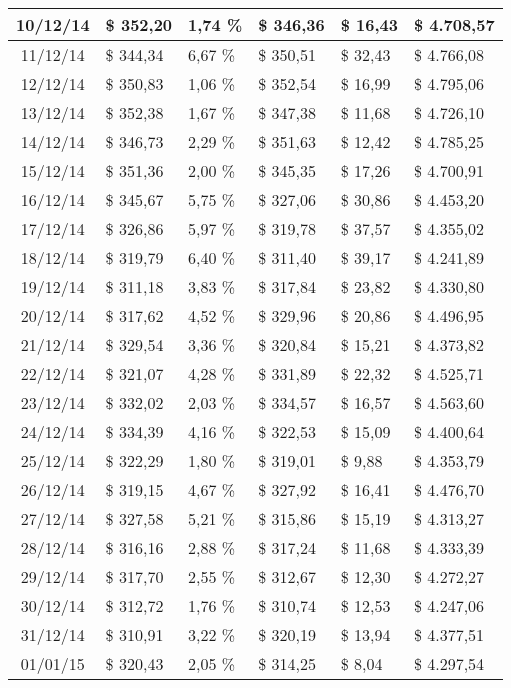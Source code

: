 \begin{small}
\begin{longtable}{|c|l|l|l|l|l|}
10/12/14 & \$ 352,20 & 1,74 \% & \$ 346,36 & \$ 16,43 & \$ 4.708,57 \\ \hline
11/12/14 & \$ 344,34 & 6,67 \% & \$ 350,51 & \$ 32,43 & \$ 4.766,08 \\ \hline
12/12/14 & \$ 350,83 & 1,06 \% & \$ 352,54 & \$ 16,99 & \$ 4.795,06 \\ \hline
13/12/14 & \$ 352,38 & 1,67 \% & \$ 347,38 & \$ 11,68 & \$ 4.726,10 \\ \hline
14/12/14 & \$ 346,73 & 2,29 \% & \$ 351,63 & \$ 12,42 & \$ 4.785,25 \\ \hline
15/12/14 & \$ 351,36 & 2,00 \% & \$ 345,35 & \$ 17,26 & \$ 4.700,91 \\ \hline
16/12/14 & \$ 345,67 & 5,75 \% & \$ 327,06 & \$ 30,86 & \$ 4.453,20 \\ \hline
17/12/14 & \$ 326,86 & 5,97 \% & \$ 319,78 & \$ 37,57 & \$ 4.355,02 \\ \hline
18/12/14 & \$ 319,79 & 6,40 \% & \$ 311,40 & \$ 39,17 & \$ 4.241,89 \\ \hline
19/12/14 & \$ 311,18 & 3,83 \% & \$ 317,84 & \$ 23,82 & \$ 4.330,80 \\ \hline
20/12/14 & \$ 317,62 & 4,52 \% & \$ 329,96 & \$ 20,86 & \$ 4.496,95 \\ \hline
21/12/14 & \$ 329,54 & 3,36 \% & \$ 320,84 & \$ 15,21 & \$ 4.373,82 \\ \hline
22/12/14 & \$ 321,07 & 4,28 \% & \$ 331,89 & \$ 22,32 & \$ 4.525,71 \\ \hline
23/12/14 & \$ 332,02 & 2,03 \% & \$ 334,57 & \$ 16,57 & \$ 4.563,60 \\ \hline
24/12/14 & \$ 334,39 & 4,16 \% & \$ 322,53 & \$ 15,09 & \$ 4.400,64 \\ \hline
25/12/14 & \$ 322,29 & 1,80 \% & \$ 319,01 & \$ 9,88 & \$ 4.353,79 \\ \hline
26/12/14 & \$ 319,15 & 4,67 \% & \$ 327,92 & \$ 16,41 & \$ 4.476,70 \\ \hline
27/12/14 & \$ 327,58 & 5,21 \% & \$ 315,86 & \$ 15,19 & \$ 4.313,27 \\ \hline
28/12/14 & \$ 316,16 & 2,88 \% & \$ 317,24 & \$ 11,68 & \$ 4.333,39 \\ \hline
29/12/14 & \$ 317,70 & 2,55 \% & \$ 312,67 & \$ 12,30 & \$ 4.272,27 \\ \hline
30/12/14 & \$ 312,72 & 1,76 \% & \$ 310,74 & \$ 12,53 & \$ 4.247,06 \\ \hline
31/12/14 & \$ 310,91 & 3,22 \% & \$ 320,19 & \$ 13,94 & \$ 4.377,51 \\ \hline
01/01/15 & \$ 320,43 & 2,05 \% & \$ 314,25 & \$ 8,04 & \$ 4.297,54 \\ \hline

\end{longtable}
\end{small}
